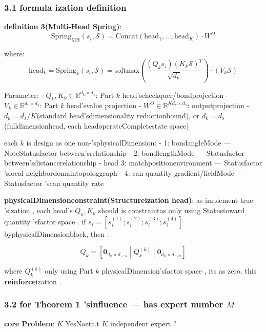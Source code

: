 \documentclass[
  12pt,
]{article}
\begin{document}
\subsubsection{3.1 formula ization definition }\label{ux5f62ux5f0fux5316ux5b9aux4e49-1}

\textbf{definition  3(Multi-Head Spring)}: 
\[\boxed{\text{Spring}_{\text{MH}}(s_i, \mathcal{S}) = \text{Concat}(\text{head}_1, \ldots, \text{head}_K) \cdot W^O}\]

where: 
\[\text{head}_k = \text{Spring}_k(s_i, \mathcal{S}) = \text{softmax}\left(\frac{(Q_k s_i)(K_k \mathcal{S})^T}{\sqrt{d_k}}\right) \cdot (V_k \mathcal{S})\]

Parameter:  - \(Q_k, K_k \in \mathbb{R}^{d_k \times d_s}\): Part \(k\)
head'scheckquer/bondprojection - \(V_k \in \mathbb{R}^{d_v \times d_s}\): Part \(k\)
head'svalue projection - \(W^O \in \mathbb{R}^{K d_v \times d_s}\): outputprojection -
\(d_k = d_s / K\)(standard head'sdimensionality reductionbound), or 
\(d_k = d_s\)(fulldimensionhead, each headoperateCompletestate space)

each  \(k\) is design as one non-'sphysicalDimension:  -  1: bondangleMode ---
NoteStatusfactor between'srelationship  -  2: bondlengthMode --- Statusfactor between'sdistancerelationship  -
head 3: matchpositionenvironment  --- Statusfactor 'slocal neighbordomaintopologgraph -  4: can quantity gradient/fieldMode
--- Statusfactor 'scan quantity rate 

\textbf{physicalDimensionconstraint(Structureization head)}: as implement true 'sization , each head's
\(Q_k, K_k\) should is constraintas only using Statustoward quantity 'sfactor space . if 
\(s_i = [s_i^{(1)}; s_i^{(2)}; s_i^{(3)}; s_i^{(4)}]\)
byphysicalDimensionblock, then : 

\[Q_k = [\mathbf{0}_{d_k \times d_{<k}} \;|\; Q_k^{(k)} \;|\; \mathbf{0}_{d_k \times d_{>k}}]\]

where \(Q_k^{(k)}\) only using Part \(k\)
physicalDimension'sfactor space , its as zero. this \textbf{reinforce}ization . 

\subsubsection{\texorpdfstring{3.2 for  Theorem 1 'sinfluence  --- has expert number 
\(M\)}{3.2 for  Theorem 1 'sinfluence  --- has expert number  M}}\label{ux5bf9-theorem-1-ux7684ux5f71ux54cd-ux6709ux6548ux4e13ux5bb6ux6570-m}

\textbf{core Problem}: \(K\) YesNoetc.t \(K\) independent expert ?
\end{document}
